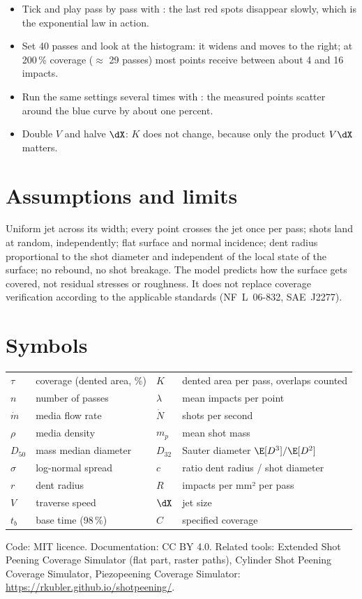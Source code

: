 \documentclass[11pt,a4paper]{article}
\begin{document}
\begin{trybox}
\begin{itemize}[nosep,leftmargin=*]
\item Tick  and play pass by pass with : the last red spots disappear slowly, which is the exponential law in action.
\item Set 40 passes and look at the histogram: it widens and moves to the right; at 200\,\% coverage ($\approx$ 29 passes) most points receive between about 4 and 16 impacts.
\item Run the same settings several times with : the measured points scatter around the blue curve by about one percent.
\item Double $V$ and halve $\dX$: $K$ does not change, because only the product $V\dX$ matters.
\end{itemize}
\end{trybox}

\section{Assumptions and limits}
Uniform jet across its width; every point crosses the jet once per pass; shots land at random, independently; flat surface and normal incidence; dent radius proportional to the shot diameter and independent of the local state of the surface; no rebound, no shot breakage. The model predicts how the surface gets covered, not residual stresses or roughness. It does not replace coverage verification according to the applicable standards (NF~L~06-832, SAE~J2277).

\appendix
\section{Symbols}
\begin{tabular}{@{}ll@{\qquad}ll@{}}
$\tau$ & coverage (dented area, \%) & $K$ & dented area per pass, overlaps counted\\
$n$ & number of passes & $\lambda$ & mean impacts per point\\
$\dot m$ & media flow rate & $\dot N$ & shots per second\\
$\rho$ & media density & $m_p$ & mean shot mass\\
$D_{50}$ & mass median diameter & $D_{32}$ & Sauter diameter $\E[D^3]/\E[D^2]$\\
$\sigma$ & log-normal spread & $c$ & ratio dent radius / shot diameter\\
$r$ & dent radius & $R$ & impacts per mm² per pass\\
$V$ & traverse speed & $\dX$ & jet size\\
$t_b$ & base time (98\,\%) & $C$ & specified coverage\\
\end{tabular}

\vfill
\noindent\small Code: MIT licence. Documentation: CC BY 4.0. Related tools: Extended Shot Peening Coverage Simulator (flat part, raster paths), Cylinder Shot Peening Coverage Simulator, Piezopeening Coverage Simulator: \url{https://rkubler.github.io/shotpeening/}.
\end{document}
